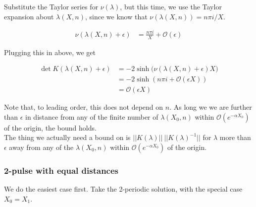 \documentclass[12pt]{article}
\begin{document}
Substitute the Taylor series for $\nu(\lambda)$, but this time, we use the Taylor expansion about $\lambda(X, n)$, since we know that $\nu( \lambda(X, n) ) = n \pi i / X$.

\begin{align*}
\nu(\lambda(X, n) + \epsilon ) &= 
\frac{n \pi i }{X} + \mathcal{O}(\epsilon)
\end{align*}

Plugging this in above, we get

\begin{align*}
\det K( \lambda(X, n) + \epsilon )
&= -2 \sinh \Big( \nu(\lambda(X, n) + \epsilon )X \Big) \\
&= -2 \sinh \left( n \pi i + \mathcal{O}(\epsilon X) \right) \\
&= \mathcal{O}(\epsilon X )
\end{align*}

Note that, to leading order, this does not depend on $n$. As long we we are further than $\epsilon$ in distance from any of the finite number of $\lambda(X_0, n)$ within $\mathcal{O}(e^{-\alpha X_0})$ of the origin, the bound holds.\\ 

The thing we actually need a bound on is $||K(\lambda)||\:||K(\lambda)^{-1}||$ for $\lambda$ more than $\epsilon$ away from any of the $\lambda(X_0, n)$ within $\mathcal{O}(e^{-\alpha X_0})$ of the origin.




\subsubsection{2-pulse with equal distances}

We do the easiest case first. Take the 2-periodic solution, with the special case $X_0 = X_1$. 
\end{document}
